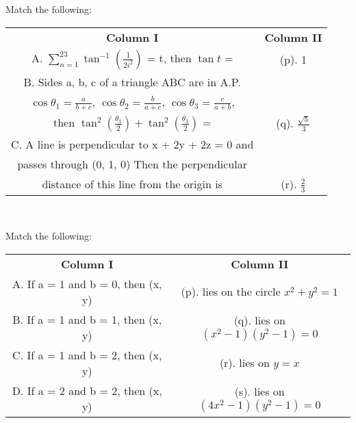 \clearpage
\item Match the following:
\begin{table}[ht!]
\centering
\begin{tabular}{c c} 
\textbf{Column I} & \textbf{Column II}\\ [0.5ex] 
     A. $\sum_{n = 1}^{23} \tan^{-1}(\frac{1}{2i^{2}})$ = t, then $\tan t$ = &               (p). 1\\
     B. Sides a, b, c of a triangle ABC are in A.P.\\ $\cos \theta_1 = \frac{a}{b + c}$,
       $\cos \theta_2 = \frac{b}{a + c}$, $\cos \theta_3 = \frac{c}{a + b}$,\\ 
       then $\tan^2(\frac{\theta_1}{2}) + \tan^2(\frac{\theta_3}{2})$ = &                 (q). $\frac{\sqrt{5}}{3}$\\
     C. A line is perpendicular to x + 2y + 2z = 0 and\\ passes through (0, 1, 0) 
        Then the perpendicular\\ distance of this line from the origin is &               (r). $\frac{2}{3}$\\[1ex] 
\end{tabular}
\end{table}\\

\item Match the following:
\begin{table}[ht!]
\centering
\begin{tabular}{c c} 
 \textbf{Column I} & \textbf{Column II}\\ [0.5ex] 
 A. If a = 1 and b = 0, then (x, y)&                           (p). lies on the circle $x^2 +y^2=1$\\
 B. If a = 1 and b = 1, then (x, y)&                           (q). lies on $(x^2 - 1)(y^2 - 1) = 0$\\
 C. If a = 1 and b = 2, then (x, y)&                           (r). lies on $y = x$\\
 D. If a = 2 and b = 2, then (x, y)&                           (s). lies on $(4x^2 - 1)(y^2 - 1) = 0$\\[1ex] 
\end{tabular}
\end{table}\\

